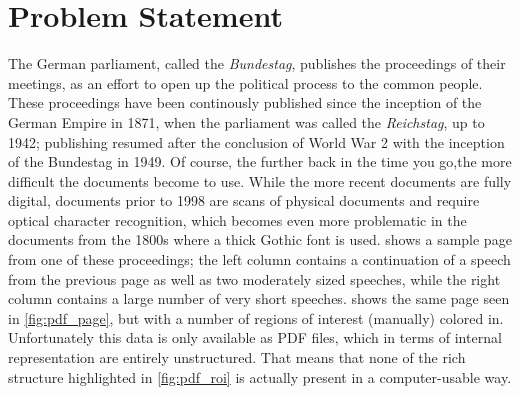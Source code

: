 \section{Problem Statement}%
\label{sec:problem}
The German parliament, called the \emph{Bundestag}, publishes the proceedings of
their meetings, as an effort to open up the political process to the common
people. These proceedings have been continously published since the inception of
the German Empire in 1871, when the parliament was called the \emph{Reichstag},
up to 1942; publishing resumed after the conclusion of World War 2 with the
inception of the Bundestag in 1949. Of course, the further back in the time you
go,the more difficult the documents become to use. While the more recent
documents are fully digital, documents prior to 1998 are scans of physical
documents and require optical character recognition, which becomes even more
problematic in the documents from the 1800s where a thick Gothic font is used.
 shows a sample page from one of these proceedings; the
left column contains a continuation of a speech from the previous page as well
as two moderately sized speeches, while the right column contains a large number
of very short speeches.  shows the same page seen in
\cref{fig:pdf_page}, but with a number of regions of interest (manually)
colored in. Unfortunately this data is only available as PDF files, which in
terms of internal representation are entirely unstructured. That means that none
of the rich structure highlighted in \cref{fig:pdf_roi} is actually
present in a computer-usable way.

